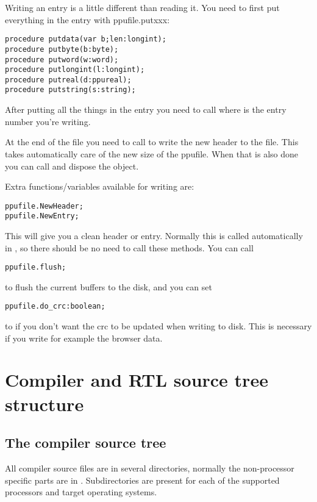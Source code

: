 Writing an entry is a little different than reading it. You need to first
put everything in the entry with ppufile.putxxx:
\begin{verbatim}
procedure putdata(var b;len:longint);
procedure putbyte(b:byte);
procedure putword(w:word);
procedure putlongint(l:longint);
procedure putreal(d:ppureal);
procedure putstring(s:string);
\end{verbatim}

After putting all the things in the entry you need to call
 where  is the entry number
you're writing.

At the end of the file you need to call  to write the
new header to the file. This takes automatically care of the new size of the
ppufile. When that is also done you can call  and dispose the
object.

Extra functions/variables available for writing are:
\begin{verbatim}
ppufile.NewHeader;
ppufile.NewEntry;
\end{verbatim}
This will give you a clean header or entry. Normally this is called
automatically in , so there should be no need to
call these methods. You can call
\begin{verbatim}
ppufile.flush;
\end{verbatim}
to flush the current buffers to the disk, and you can set
\begin{verbatim}
ppufile.do_crc:boolean;
\end{verbatim}
to  if you don't want the crc to be updated when writing to disk.
This is necessary if you write for example the browser data.


\chapter{Compiler and RTL source tree structure}
\label{ch:AppB}

\section{The compiler source tree}

All compiler source files are in several directories, normally the
non-processor specific parts are in . Subdirectories
are present for each of the supported processors and target operating systems.

